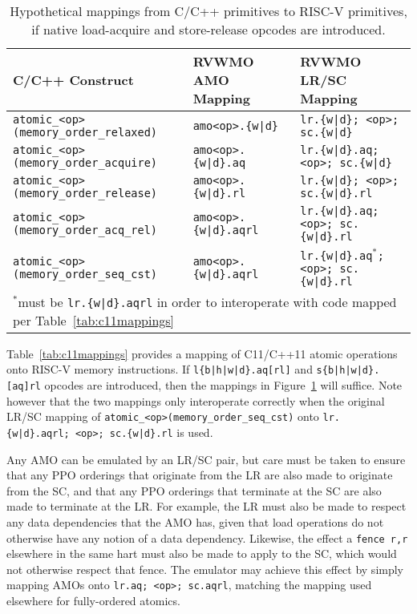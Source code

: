 \begin{table}[h!]
  \footnotesize
  \begin{tabular}{|l|l|l|}
    \hline
    C/C++ Construct                               & RVWMO AMO Mapping       & RVWMO LR/SC Mapping\\
    \hline
    \tt atomic\_<op>(memory\_order\_relaxed)  & \tt amo<op>.\{w|d\}      & \tt lr.\{w|d\}; <op>; sc.\{w|d\} \\
    \hline
    \tt atomic\_<op>(memory\_order\_acquire)  & \tt amo<op>.\{w|d\}.aq   & \tt lr.\{w|d\}.aq; <op>; sc.\{w|d\} \\
    \hline
    \tt atomic\_<op>(memory\_order\_release)  & \tt amo<op>.\{w|d\}.rl   & \tt lr.\{w|d\}; <op>; sc.\{w|d\}.rl \\
    \hline
    \tt atomic\_<op>(memory\_order\_acq\_rel) & \tt amo<op>.\{w|d\}.aqrl & \tt lr.\{w|d\}.aq; <op>; sc.\{w|d\}.rl \\
    \hline
    \tt atomic\_<op>(memory\_order\_seq\_cst) & \tt amo<op>.\{w|d\}.aqrl & \tt lr.\{w|d\}.aq$^*$; <op>; sc.\{w|d\}.rl \\
    \hline
    \multicolumn{3}{l}{$^*$must be {\tt lr.\{w|d\}.aqrl} in order to interoperate with code mapped per Table~\ref{tab:c11mappings}}
  \end{tabular}
  \caption{Hypothetical mappings from C/C++ primitives to RISC-V primitives, if native load-acquire and store-release opcodes are introduced.}
  \label{tab:c11mappings_hypothetical}
\end{table}

Table~\ref{tab:c11mappings} provides a mapping of C11/C++11 atomic operations onto RISC-V memory instructions.
If {\tt l\{b|h|w|d\}.aq[rl]} and {\tt s\{b|h|w|d\}.[aq]rl} opcodes are introduced, then the mappings in Figure~\ref{tab:c11mappings_hypothetical} will suffice.
Note however that the two mappings only interoperate correctly when the original LR/SC mapping of {\tt atomic\_<op>(memory\_order\_seq\_cst)} onto {\tt lr.\{w|d\}.aqrl;~<op>;~sc.\{w|d\}.rl} is used.


Any AMO can be emulated by an LR/SC pair, but care must be taken to ensure that any PPO orderings that originate from the LR are also made to originate from the SC, and that any PPO orderings that terminate at the SC are also made to terminate at the LR.
For example, the LR must also be made to respect any data dependencies that the AMO has, given that load operations do not otherwise have any notion of a data dependency.
Likewise, the effect a {\tt fence r,r} elsewhere in the same hart must also be made to apply to the SC, which would not otherwise respect that fence.
The emulator may achieve this effect by simply mapping AMOs onto {\tt lr.aq;~<op>;~sc.aqrl}, matching the mapping used elsewhere for fully-ordered atomics.

